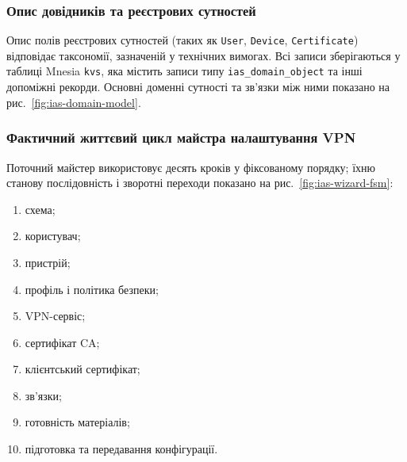 \documentclass{article}
\begin{document}
\subsubsection{Опис довідників та реєстрових сутностей}
Опис полів реєстрових сутностей (таких як \texttt{User}, \texttt{Device}, \texttt{Certificate}) відповідає таксономії, зазначеній у технічних вимогах. Всі записи зберігаються у таблиці Mnesia \texttt{kvs}, яка містить записи типу \texttt{ias\_domain\_object} та інші допоміжні рекорди. Основні доменні сутності та зв'язки між ними показано на рис.~\ref{fig:ias-domain-model}.

\subsubsection{Фактичний життєвий цикл майстра налаштування VPN}
Поточний майстер використовує десять кроків у фіксованому порядку; їхню станову послідовність і зворотні переходи показано на рис.~\ref{fig:ias-wizard-fsm}:
\begin{enumerate}
    \item схема;
    \item користувач;
    \item пристрій;
    \item профіль і політика безпеки;
    \item VPN-сервіс;
    \item сертифікат CA;
    \item клієнтський сертифікат;
    \item зв'язки;
    \item готовність матеріалів;
    \item підготовка та передавання конфігурації.
\end{enumerate}
\end{document}
